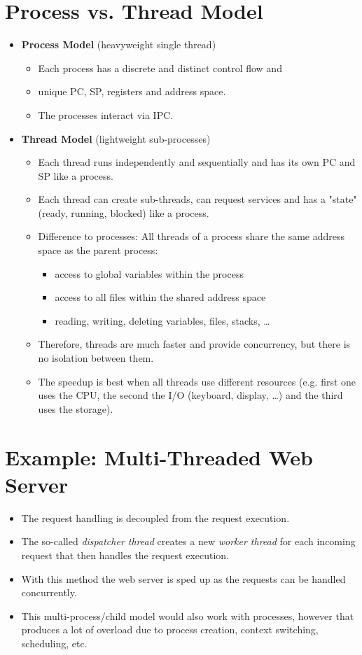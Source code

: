 	\section{Process vs. Thread Model}
		\begin{itemize}
			\item \textbf{Process Model} (heavyweight single thread)
				\begin{itemize}
					\item Each process has a discrete and distinct control flow and
					\item unique PC, SP, registers and address space.
					\item The processes interact via IPC.
				\end{itemize}
			\item \textbf{Thread Model} (lightweight sub-processes)
				\begin{itemize}
					\item Each thread runs independently and sequentially and has its own PC and SP like a process.
					\item Each thread can create sub-threads, can request services and has a "state" (ready, running, blocked) like a process.
					\item Difference to processes: All threads of a process share the same address space as the parent process:
						\begin{itemize}
							\item access to global variables within the process
							\item access to all files within the shared address space
							\item reading, writing, deleting variables, files, stacks, \dots
						\end{itemize}
					\item Therefore, threads are much faster and provide concurrency, but there is no isolation between them.
					\item The speedup is best when all threads use different resources (e.g. first one uses the CPU, the second the I/O (keyboard, display, \dots) and the third uses the storage).
				\end{itemize}
		\end{itemize}

	\section{Example: Multi-Threaded Web Server}
		\begin{itemize}
			\item The request handling is decoupled from the request execution.
			\item The so-called \textit{dispatcher thread} creates a new \textit{worker thread} for each incoming request that then handles the request execution.
			\item With this method the web server is sped up as the requests can be handled concurrently.
			\item This multi-process/child model would also work with processes, however that produces a lot of overload due to process creation, context switching, scheduling, etc.
		\end{itemize}

